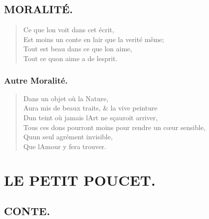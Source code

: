 \documentclass[14pt,a4paper]{memoir}
\begin{document}
\begin{otherlanguage}{french}
\section{MORALITÉ.}

\begin{verse}
  \small
Ce que l\textquotesingle on voit dans cet écrit, \\
Est moins un conte en l\textquotesingle air que la verité même;  \\
Tout est beau dans ce que l\textquotesingle on aime, \\
Tout ce qu\textquotesingle on aime a de l\textquotesingle esprit.
\end{verse}


\subsection{Autre Moralité.}

\begin{verse}
  \small
Dans un objet où la Nature, \\
Aura mis de beaux traits, \& la vive peinture  \\
D\textquotesingle un teint où jamais l\textquotesingle Art ne sçauroit arriver,  \\
Tous ces dons pourront moins pour rendre un cœur sensible, \\
Qu\textquotesingle un seul agrément invisible, \\
Que l\textquotesingle Amour y fera trouver.

\end{verse}



\chapter{LE PETIT POUCET.}

\section{CONTE.}


\end{otherlanguage}
\end{document}
